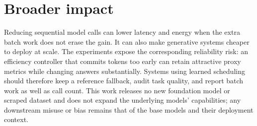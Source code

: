 \documentclass{article}
\begin{document}
\section{Broader impact}

Reducing sequential model calls can lower latency and energy when the extra batch work does not erase the gain. It can also make generative systems cheaper to deploy at scale. The experiments expose the corresponding reliability risk: an efficiency controller that commits tokens too early can retain attractive proxy metrics while changing answers substantially. Systems using learned scheduling should therefore keep a reference fallback, audit task quality, and report batch work as well as call count. This work releases no new foundation model or scraped dataset and does not expand the underlying models' capabilities; any downstream misuse or bias remains that of the base models and their deployment context.

\newpage

\end{document}
